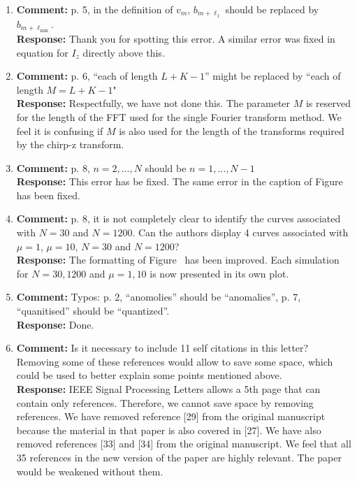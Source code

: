 \documentclass[a4paper,10pt]{article}
\begin{document}
\begin{enumerate}
\begin{enumerate}
\end{enumerate}



\item\textbf{Comment:}
p. 5, in the definition of $v_m$, $b_{m+\ell_1}$ should be replaced by $b_{m+\ell_{\text{min}}}$.
\\
\textbf{Response:}
Thank you for spotting this error.  A similar error was fixed in equation for $I_z$ directly above this. 


\item\textbf{Comment:}
p. 6, ``each of length $L+K-1$'' might be replaced by ``each of length $M = L + K - 1$"
\\
\textbf{Response:}
Respectfully, we have not done this.  The parameter $M$ is reserved for the length of the FFT used for the single Fourier transform method.  We feel it is confusing if $M$ is also used for the length of the transforms required by the chirp-z transform.


\item\textbf{Comment:}
p. 8, $n = 2,\dots,N$ should be $n = 1, \dots, N - 1$
\\
\textbf{Response:}
This error has be fixed.  The same error in the caption of Figure~ has been fixed.


\item\textbf{Comment:}
p. 8, it is not completely clear to identify the curves associated with $N = 30$ and $N = 1200$. Can the authors display 4 curves associated with $\mu= 1$, $\mu = 10$, $N = 30$ and $N = 1200$?
\\
\textbf{Response:}
The formatting of Figure~ has been improved.  Each simulation for $N=30,1200$ and $\mu=1,10$ is now presented in its own plot.

\item\textbf{Comment:}
Typos: p. 2, ``anomolies'' should be ``anomalies'', p. 7, ``quanitised'' should be
``quantized''.
\\
\textbf{Response:}
Done.


\item\textbf{Comment:} 
Is it necessary to include 11 self citations in this letter? Removing some of
these references would allow to save some space, which could be used to better
explain some points mentioned above.
\\
\textbf{Response:}
IEEE Signal Processing Letters allows a 5th page that can contain only references.  Therefore, we cannot save space by removing references.   We have removed reference [29] from the original manuscript because the material in that paper is also covered in [27].  We have also removed references [33] and [34] from the original manuscript. We feel that all 35 references in the new version of the paper are highly relevant. The paper would be weakened without them.

\end{enumerate}
\end{document}
